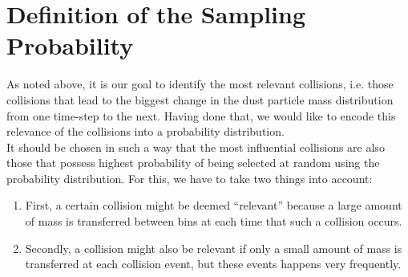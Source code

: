 





\clearpage\section{Definition of the Sampling Probability}
\label{sec:definition_of_the_sampling_probability}

    As noted above, it is our goal to identify the most relevant collisions, i.e. those collisions 
    that lead to the biggest change in the dust particle mass distribution from one time-step to 
    the next.
    Having done that, we would like to encode this relevance of the collisions into a probability
    distribution. \\

    It should be chosen in such a way that the most influential collisions are also those that 
    possess highest probability of being selected at random using the probability distribution. 
    For this, we have to take two things into account: 
    \begin{enumerate}
        \item First, a certain collision might be deemed ``relevant'' because a large amount of mass
              is transferred between bins at each time that such a collision occurs.
        \item Secondly, a collision might also be relevant if only a small amount of mass is
              transferred at each collision event, but these events happens very frequently.
    \end{enumerate}

